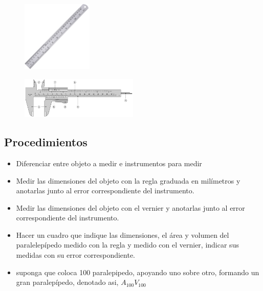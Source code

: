 \begin{figure}[H]
	\begin{center}
 		\includegraphics[width = 0.3\textwidth]{Imagenes/regla.jpg}
	\end{center} 
\end{figure}

\begin{figure}[H]
	\begin{center}
 		\includegraphics[width = 0.5\textwidth]{Imagenes/vernier.png}
	\end{center} 
\end{figure}

\subsection{Procedimientos}
\begin{itemize}
    \item Diferenciar entre objeto a medir e instrumentos para medir
    \item Medir las dimensiones del objeto con la regla graduada en milímetros y anotarlas junto al error correspondiente del instrumento.
    \item Medir las dimensiones del objeto con el vernier y anotarlas junto al error correspondiente del instrumento.
    \item Hacer un cuadro que indique las dimensiones, el área y volumen del paralelepípedo medido con la regla y medido con el vernier, indicar sus medidas con su error correspondiente.
    \item suponga que coloca 100 paralepipedo, apoyando uno sobre otro, formando un gran paralepípedo, denotado asi, $A_{100} V_{100}$
\end{itemize}

